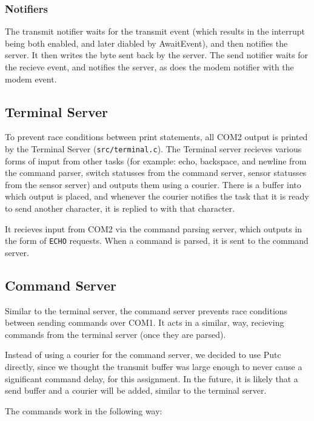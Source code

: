 \documentclass{article}
\begin{document}
\subsubsection{Notifiers}
The transmit notifier waits for the transmit event (which results in the interrupt being both enabled, and later diabled by AwaitEvent), and then notifies the server. It then writes the byte sent back by the server. The send notifier waits for the recieve event, and notifies the server, as does the modem notifier with the modem event.

\subsection{Terminal Server}
To prevent race conditions between print statements, all COM2 output is printed by the Terminal Server (\verb|src/terminal.c|). 
The Terminal server recieves various forms of imput from other tasks (for example: echo, backspace, and newline from the command parser, switch statusses from the command server, sensor statusses from the sensor server) and outputs them using a courier. There is a buffer into which output is placed, and whenever the courier notifies the task that it is ready to send another character, it is replied to with that character. 

It recieves input from COM2 via the command parsing server, which outputs in the form of \verb|ECHO| requests. When a command is parsed, it is sent to the command server.
\subsection{Command Server}
Similar to the terminal server, the command server prevents race conditions between sending commands over COM1. It acts in a similar, way, recieving commands from the terminal server (once they are parsed). 

Instead of using a courier for the command server, we decided to use Putc directly, since we thought the transmit buffer was large enough to never cause a significant command delay, for this assignment. In the future, it is likely that a send buffer and a courier will be added, similar to the terminal server.

The commands work in the following way:
\end{document}
